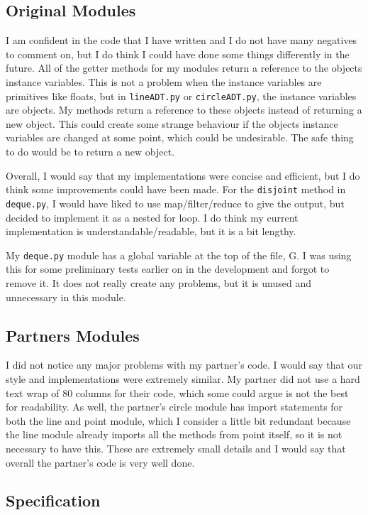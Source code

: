 \documentclass[12pt]{article}
\begin{document}
\subsection{Original Modules}

I am confident in the code that I have written and I do not have many negatives to comment on, but I do think I could have done some things differently in the future. All of the getter methods for my modules return a reference to the objects instance variables. This is not a problem when the instance variables are primitives like floats, but in {\tt lineADT.py} or {\tt circleADT.py}, the instance variables are objects. My methods return a reference to these objects instead of returning a new object. This could create some strange behaviour if the objects instance variables are changed at some point, which could be undesirable. The safe thing to do would be to return a new object. 

Overall, I would say that my implementations were concise and efficient, but I do think some improvements could have been made. For the {\tt disjoint} method in {\tt deque.py}, I would have liked to use map/filter/reduce to give the output, but decided to implement it as a nested for loop. I do think my current implementation is understandable/readable, but it is a bit lengthy. 

My {\tt deque.py} module has a global variable at the top of the file, G. I was using this for some preliminary tests earlier on in the development and forgot to remove it. It does not really create any problems, but it is unused and unnecessary in this module. 

\subsection{Partners Modules}

I did not notice any major problems with my partner's code. I would say that our style and implementations were extremely similar. My partner did not use a hard text wrap of 80 columns for their code, which some could argue is not the best for readability. As well, the partner's circle module has import statements for both the line and point module, which I consider a little bit redundant because the line module already imports all the methods from point itself, so it is not necessary to have this. These are extremely small details and I would say that overall the partner's code is very well done.

\subsection{Specification} 
\end{document}
